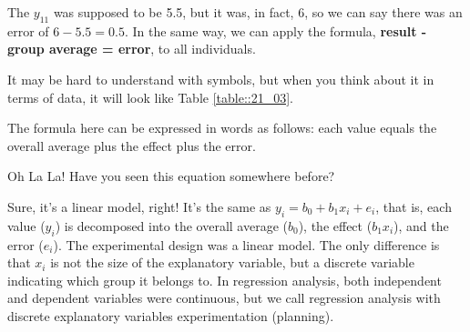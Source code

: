 \documentclass{ltjbook}
\begin{document}
The $y_{11}$ was supposed to be 5.5, but it was, in fact, 6, so we can say there was an error of $6-5.5=0.5$. In the same way, we can apply the formula, \textbf{result - group average = error}, to all individuals.

It may be hard to understand with symbols, but when you think about it in terms of data, it will look like Table \ref{table::21_03}.


The formula here can be expressed in words as follows: each value equals the overall average plus the effect plus the error.

Oh La La! Have you seen this equation somewhere before?


Sure, it's a linear model, right! It's the same as $y_i=b_0 + b_1x_i + e_i$, that is, each value ($y_i$) is decomposed into the overall average ($b_0$), the effect ($b_1x_i$), and the error ($e_i$). The experimental design was a linear model.
The only difference is that $x_i$ is not the size of the explanatory variable, but a discrete variable indicating which group it belongs to.
In regression analysis, both independent and dependent variables were continuous, but we call regression analysis with discrete explanatory variables experimentation (planning).


\end{document}
